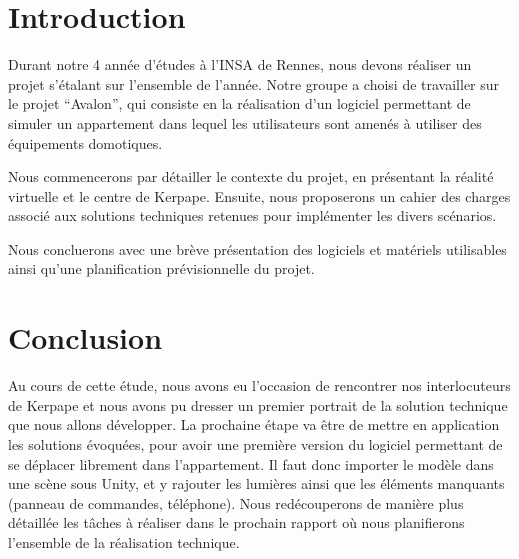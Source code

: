 \documentclass[a4paper,11pt]{article}
\begin{document}
\begin{figure}[h!]
\begin{minipage}{0.2\linewidth}
   \end{minipage}
\end{figure}

\pagebreak

\tableofcontents
\pagebreak

\section{Introduction}
Durant notre 4 année d'études à l'INSA de Rennes, nous devons réaliser un projet s'étalant sur l'ensemble de l'année. Notre groupe a choisi de travailler sur le projet \enquote{Avalon}, qui consiste en la réalisation d'un logiciel permettant de simuler un appartement dans lequel les utilisateurs sont amenés à utiliser des équipements domotiques.

Nous commencerons par détailler le contexte du projet, en présentant la réalité virtuelle et le centre de Kerpape. Ensuite, nous proposerons un cahier des charges associé aux solutions techniques retenues pour implémenter les divers scénarios.

Nous concluerons avec une brève présentation des logiciels et matériels utilisables ainsi qu'une planification prévisionnelle du projet.


\pagebreak

\pagebreak

\pagebreak

\pagebreak

\pagebreak

\pagebreak

\section{Conclusion}
Au cours de cette étude, nous avons eu l'occasion de rencontrer nos interlocuteurs de Kerpape et nous avons pu dresser un premier portrait de la solution technique que nous allons développer.
La prochaine étape va être de mettre en application les solutions évoquées, pour avoir une première version du logiciel permettant de se déplacer librement dans l'appartement.
Il faut donc importer le modèle dans une scène sous Unity, et y rajouter les lumières ainsi que les éléments manquants (panneau de commandes, téléphone).
Nous redécouperons de manière plus détaillée les tâches à réaliser dans le prochain rapport où nous planifierons l'ensemble de la réalisation technique.

\pagebreak


\end{document}
